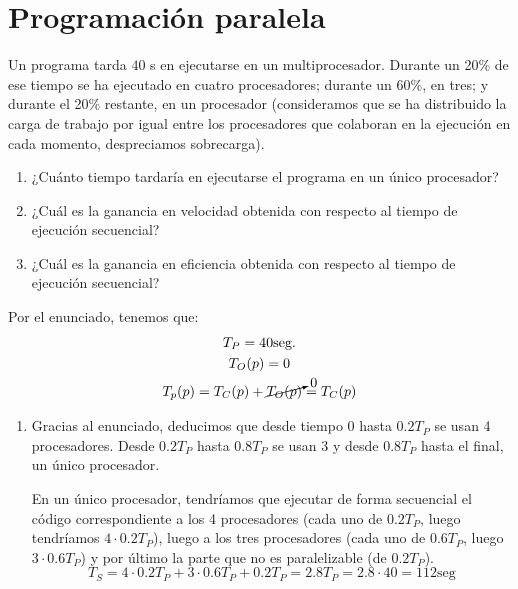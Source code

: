 \section{Programación paralela}

\begin{ejercicio}
    Un programa tarda $40$ s en ejecutarse en un multiprocesador. Durante un 20\% de ese tiempo se
    ha ejecutado en cuatro procesadores; durante un 60\%, en tres; y durante el 20\% restante, en un procesador
    (consideramos que se ha distribuido la carga de trabajo por igual entre los procesadores que colaboran en la
    ejecución en cada momento, despreciamos sobrecarga).
    \begin{enumerate}
        \item ¿Cuánto tiempo tardaría en ejecutarse el programa
        en un único procesador?
        \item ¿Cuál es la ganancia en velocidad obtenida con respecto al tiempo de ejecución
        secuencial?
        \item ¿Cuál es la ganancia en eficiencia obtenida con respecto al tiempo de ejecución
        secuencial?
    \end{enumerate}

    Por el enunciado, tenemos que:
        \begin{gather*}
            T_P = 40 \text{seg.} \\
            T_O(p) = 0 \\
            T_p(p) = T_C(p) + \cancelto{0}{T_O(p)} = T_C(p)
        \end{gather*}
    \begin{enumerate}
        \item
        Gracias al enunciado, deducimos que desde tiempo 0 hasta $0.2T_P$ se usan 4 procesadores. Desde $0.2T_P$ hasta $0.8T_P$ se usan 3 y desde $0.8T_P$ hasta el final, un único procesador.

        En un único procesador, tendríamos que ejecutar de forma secuencial el código correspondiente a los 4 procesadores (cada uno de $0.2T_P$, luego tendríamos $4\cdot 0.2T_P$), luego a los tres procesadores (cada uno de $0.6T_P$, luego $3\cdot 0.6T_P$) y por último la parte que no es paralelizable (de $0.2T_P$).
        \begin{equation*}
            T_S = 4\cdot 0.2T_P + 3\cdot 0.6T_P + 0.2T_P = 2.8T_P = 2.8 \cdot 40= 112 \text{seg}
        \end{equation*}


\end{enumerate}
\end{ejercicio}
